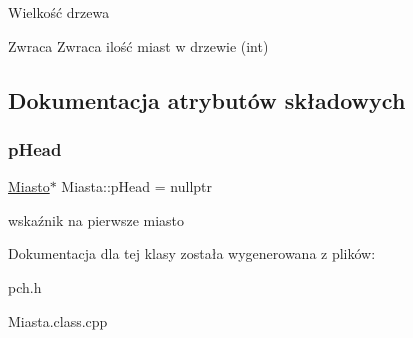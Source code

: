 Wielkość drzewa \begin{DoxyReturn}{Zwraca}
Zwraca ilość miast w drzewie (int) 
\end{DoxyReturn}


\subsection{Dokumentacja atrybutów składowych}
\mbox{\label{class_miasta_acd89fd213dfd8fbdc85daee30a22a460}} 
\subsubsection{\texorpdfstring{p\+Head}{pHead}}
{\footnotesize\ttfamily \mbox{\hyperlink{struct_miasto}{Miasto}}$\ast$ Miasta\+::p\+Head = nullptr}

wskaźnik na pierwsze miasto 

Dokumentacja dla tej klasy została wygenerowana z plików\+:\begin{DoxyCompactItemize}
\item 
pch.\+h\item 
Miasta.\+class.\+cpp\end{DoxyCompactItemize}
